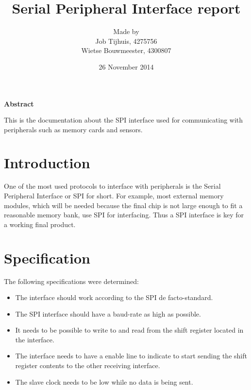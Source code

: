\documentclass[11pt,twoside,a4paper]{article}
\title{Serial Peripheral Interface report}
\author{
Made by\\
Job Tijhuis, 4275756\\
Wietse Bouwmeester, 4300807\\
}
\date{26 November 2014}
\begin{document}
\maketitle
\thispagestyle{empty}
\vspace{30 mm}
\begin{center}
\Large \bf 
Abstract
\end{center}
This is the documentation about the SPI interface used for communicating with peripherals such as memory cards and sensors.
\clearpage

\tableofcontents
\clearpage

\section{Introduction}
One of the most used protocols to interface with peripherals is the Serial Peripheral Interface or SPI for short. For example, most external memory modules, which will be needed because the final chip is not large enough to fit a reasonable memory bank, use SPI for interfacing. Thus a SPI interface is key for a working final product.

\section{Specification}
The following specifications were determined:
\begin{itemize}
\item The interface should work according to the  SPI de facto-standard.
\item The SPI interface should have a baud-rate as high as possible.
\item It needs to be possible to write to and read from the shift register located in the interface.
\item The interface needs to have a enable line to indicate to start sending the shift register contents to the other receiving interface.\item The slave clock needs to be low while no data is being sent.
\end{itemize}
\end{document}
